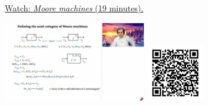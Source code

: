 
\begin{minipage}{10cm}
    \href{https://act4e-spring21.netlify.app/videos/spring2021-actions:semi-actions:processes:moore.html}{Watch: \emph{Moore machines} (19 minutes).}
        
    \href{https://act4e-spring21.netlify.app/videos/spring2021-actions:semi-actions:processes:moore.html}{\includegraphics[height=3.5cm]{spring2021-actions:semi-actions:processes:moore/thumbnails.jpg}}
    \href{https://act4e-spring21.netlify.app/videos/spring2021-actions:semi-actions:processes:moore.html}{\includegraphics[height=2.5cm]{spring2021-actions:semi-actions:processes:moore/qrcode.png}}
\end{minipage}
